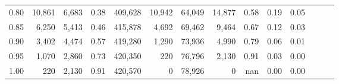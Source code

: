\begin{tabular}{rrrrrrrrrrrrrr}
0.80 &  10,861 &  6,683 &  0.38 &  409,628 &   10,942 &  64,049 &  14,877 &  0.58 &  0.19 &      0.05 \\
0.85 &   6,250 &  5,413 &  0.46 &  415,878 &    4,692 &  69,462 &   9,464 &  0.67 &  0.12 &      0.03 \\
0.90 &   3,402 &  4,474 &  0.57 &  419,280 &    1,290 &  73,936 &   4,990 &  0.79 &  0.06 &      0.01 \\
0.95 &   1,070 &  2,860 &  0.73 &  420,350 &      220 &  76,796 &   2,130 &  0.91 &  0.03 &      0.00 \\
1.00 &     220 &  2,130 &  0.91 &  420,570 &        0 &  78,926 &       0 &   nan &  0.00 &      0.00 \\
\bottomrule
\end{tabular}
